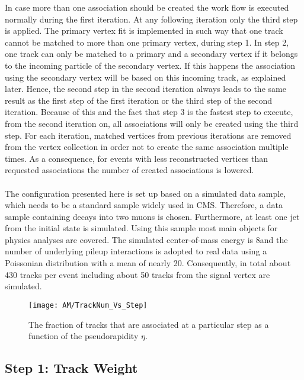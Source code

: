 In case more than one association should be created the work flow is executed normally during the first iteration. At any following iteration only the third step is applied. The primary vertex fit is implemented in such way that one track cannot be matched to more than one primary vertex, during step 1. In step 2, one track can only be matched to a primary and a secondary vertex if it belongs to the incoming particle of the secondary vertex. If this happens the association using the secondary vertex will be based on this incoming track, as explained later. Hence, the second step in the second iteration always leads to the same result as the first step of the first iteration or the third step of the second iteration. Because of this and the fact that step 3 is the fastest step to execute, from the second iteration on, all associations will only be created using the third step. For each iteration, matched vertices from previous iterations are removed from the vertex collection in order not to create the same association multiple times. As a consequence, for events with less reconstructed vertices than requested associations the number of created associations is lowered. \\ \\
The configuration presented here is set up based on a simulated data sample, which needs to be a standard sample widely used in CMS. Therefore, a data sample containing \Zz decays into two muons is chosen. Furthermore, at least one jet from the initial state is simulated. Using this sample most main objects for physics analyses are covered. The simulated center-of-mass energy is 8\TeV and the number of underlying pileup interactions is adopted to real data using a Poissonian distribution with a mean of nearly 20. Consequently, in total about 430 tracks per event including about 50 tracks from the signal vertex are simulated.

\begin{figure}[!ht]
    \centering
    \texttt{[image: AM/TrackNum\_Vs\_Step]}
    \caption[Plot of the fraction of tracks to be associated at which step]{The fraction of tracks that are associated at a particular step as a function of the pseudorapidity $\eta{}$.\label{plot:AMTrackStepFrac}}
\end{figure}

\subsection{Step 1: Track Weight \label{sec:AMWFTW}}

